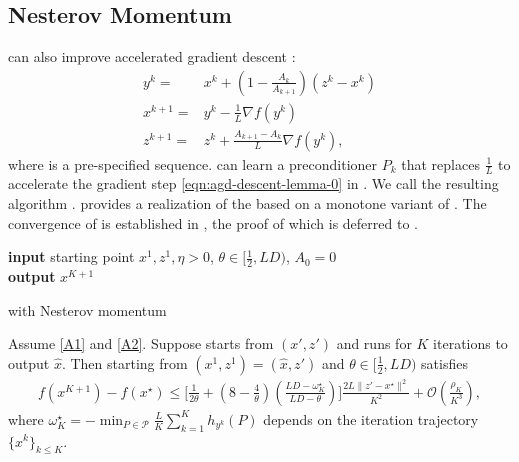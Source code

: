 \subsection{Nesterov Momentum} \label{sec:nesterov}
{\hdm} can also improve accelerated gradient descent {\agd}:\begin{align}
  y^k ={} & x^k + ( 1 - \tfrac{A_k}{A_{k + 1}} ) (z^k - x^k)
  \nonumber\\
  x^{k + 1} ={} & y^k - \tfrac{1}{L} \nabla f (y^k) \label{eqn:agd-descent-lemma-0}\\
  z^{k + 1} ={} & z^k + \tfrac{A_{k + 1} - A_k}{L} \nabla f (y^k), \nonumber
\end{align}
where is a pre-specified sequence. 
{\hdm} can learn a preconditioner $P_k$ that replaces $\frac 1 L$ to accelerate the gradient step \eqref{eqn:agd-descent-lemma-0} in {\agd}. We call the resulting algorithm {\hdmagd}.  provides a
realization of the {\hdmagd} based on a monotone variant of {\agd} \cite{d2021acceleration}. The convergence of {\hdmagd} is established in , the proof of which is deferred to .
\begin{algorithm}[h]
{\textbf{input} starting point $x^1, z^1, \eta > 0$, $\theta \in [\tfrac{1}{2}, LD) $, $A_0 = 0$}\\
{\textbf{output} $x^{K+1}$}
\caption{{\hdm} with Nesterov momentum  \label{alg:osnes}}
\end{algorithm}

\begin{thm}
\label{thm:osnes}
Assume \ref{A1} and \ref{A2}. Suppose {\agd} starts from $(x', z')$ and runs for $K$ iterations to output $\hat{x}$.
Then  starting from $(x^1, z^1) = (\hat{x}, z')$ and $\theta \in [\tfrac{1}{2}, LD)$ satisfies
\begin{align}
f (x^{K + 1}) - f (x^{\star}) \leq \big[ \tfrac{1}{2 \theta} + ( 8 - \tfrac{4}{\theta} ) ( \tfrac{L D - \omega^\star_K}{L D - \theta} ) \big] \tfrac{2 L \| z' - x^{\star} \|^2}{K^2} +\mathcal{O} ( \tfrac{\rho_K}{K^3} ), \nonumber
\end{align}
where $\omega^\star_K = - \min_{P \in \mathcal{P}} \tfrac{L}{K} \sum_{k = 1}^K h_{y^k} (P)$ depends on the iteration trajectory $\{x^k\}_{k \leq K}$.
\end{thm}

